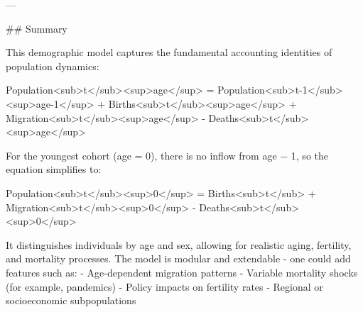 \documentclass{article}
\begin{document}
{---

## Summary

This demographic model captures the fundamental accounting identities of population dynamics:

Population<sub>t</sub><sup>age</sup> = Population<sub>t-1</sub><sup>age-1</sup> + Births<sub>t</sub><sup>age</sup> + Migration<sub>t</sub><sup>age</sup> - Deaths<sub>t</sub><sup>age</sup>

For the youngest cohort (age = 0), there is no inflow from age − 1,  
so the equation simplifies to:

Population<sub>t</sub><sup>0</sup> = Births<sub>t</sub> + Migration<sub>t</sub><sup>0</sup> - Deaths<sub>t</sub><sup>0</sup>

It distinguishes individuals by age and sex, allowing for realistic aging, fertility, and mortality processes.
The model is modular and extendable - one could add features such as:
- Age-dependent migration patterns
- Variable mortality shocks (for example, pandemics)
- Policy impacts on fertility rates
- Regional or socioeconomic subpopulations

   }
\end{document}
